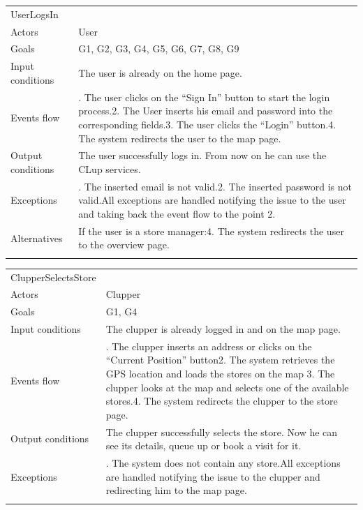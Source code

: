 \documentclass[
]{article}
\begin{document}
\begin{longtable}[]{@{}
  >{\raggedright\arraybackslash}p{}
  >{\raggedright\arraybackslash}p{}@{}}
\toprule
UserLogsIn & \\ \addlinespace
\midrule
\endhead
Actors & User \\ \addlinespace
Goals & G1, G2, G3, G4, G5, G6, G7, G8, G9 \\ \addlinespace
Input conditions & The user is already on the home
page. \\ \addlinespace
Events flow & 1. The user clicks on the ``Sign In'' button to start the
login process.2. The User inserts his email and password into the
corresponding fields.3. The user clicks the ``Login'' button.4. The
system redirects the user to the map page. \\ \addlinespace
Output conditions & The user successfully logs in. From now on he can
use the CLup services. \\ \addlinespace
Exceptions & 1. The inserted email is not valid.2. The inserted password
is not valid.All exceptions are handled notifying the issue to the user
and taking back the event flow to the point 2. \\ \addlinespace
Alternatives & If the user is a store manager:4. The system redirects
the user to the overview page. \\ \addlinespace
\bottomrule
\end{longtable}

\begin{longtable}[]{@{}
  >{\raggedright\arraybackslash}p{}
  >{\raggedright\arraybackslash}p{}@{}}
\toprule
ClupperSelectsStore & \\ \addlinespace
\midrule
\endhead
Actors & Clupper \\ \addlinespace
Goals & G1, G4 \\ \addlinespace
Input conditions & The clupper is already logged in and on the map
page. \\ \addlinespace
Events flow & 1. The clupper inserts an address or clicks on the
``Current Position'' button2. The system retrieves the GPS location and
loads the stores on the map 3. The clupper looks at the map and selects
one of the available stores.4. The system redirects the clupper to the
store page. \\ \addlinespace
Output conditions & The clupper successfully selects the store. Now he
can see its details, queue up or book a visit for it. \\ \addlinespace
Exceptions & 1. The system does not contain any store.All exceptions are
handled notifying the issue to the clupper and redirecting him to the
map page. \\ \addlinespace
\bottomrule
\end{longtable}
\end{document}
